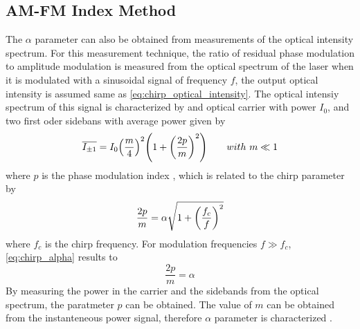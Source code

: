 \subsection{AM-FM Index Method}
The $\alpha$ parameter can also be obtained from measurements of the optical intensity spectrum. For this measurement technique, the ratio of residual phase modulation to amplitude modulation is measured from the optical spectrum of the laser when it is modulated with a sinusoidal signal of frequency $f$, the output optical intensity is assumed same as \autoref{eq:chirp_optical_intensity}. The optical intensiy spectrum of this signal is characterized by and optical carrier with power $I_0$, and two first oder sidebans with average power given by \cite{harder1983measurement}
\begin{equation}
    \overline{I_{\pm 1}}=I_0\qty(\frac{m}{4})^2\qty(1+\qty(\frac{2p}{m})^2) \qquad with \ m \ll 1
\end{equation}
where $p$ is the phase modulation index \cite{harder1983measurement}, which is related to the chirp parameter by \cite{bjerkan1996measurement}
\begin{equation}
    \frac{2p}{m}=\alpha\sqrt{1+\qty(\frac{f_c}{f})^2}
    \label{eq:chirp_alpha}
\end{equation}
where $f_c$ is the chirp frequency. For modulation frequencies $f \gg f_c$, \autoref{eq:chirp_alpha} results to \cite{harder1983measurement}
\begin{equation}
    \frac{2p}{m}=\alpha
    \label{eq:chirp_alpha_2}
\end{equation}
By measuring the power in the carrier and the sidebands from the optical spectrum, the paratmeter $p$ can be obtained. The value of $m$ can be obtained from the instanteneous power signal, therefore $\alpha$ parameter is characterized \cite{villafranca2007precise, harder1983measurement}.

